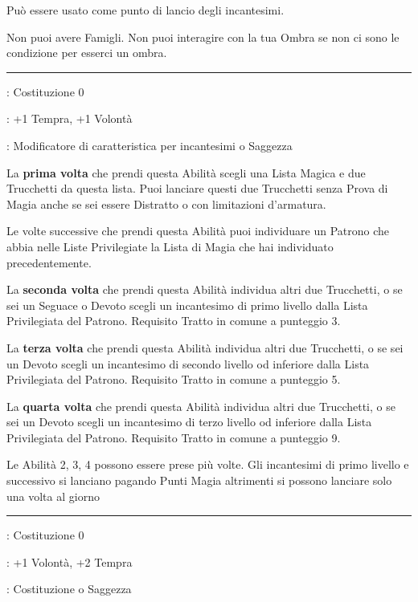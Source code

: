 \begin{multicols}{2}
Può essere usato come punto di lancio degli incantesimi.

Non puoi avere Famigli. Non puoi interagire con la tua Ombra se non ci sono le condizione per esserci un ombra.

\smallskip\noindent\rule{\linewidth}{2pt} \hypertarget{Figlio Unico}{}\medskip{}
\noindent
\begin{description}[noitemsep, topsep=0pt, parsep=0pt, partopsep=0pt, leftmargin=0cm, labelwidth=2.5cm]
    \item[\textbf{Requisito}]: Costituzione 0
    \item[\textbf{Tiri Salvezza}]: +1 Tempra, +1 Volontà
    \item[\textbf{Caratteristica}]: Modificatore di caratteristica per incantesimi o Saggezza
\end{description}

La \textbf{prima volta} che prendi questa Abilità scegli una Lista Magica e due Trucchetti da questa lista. Puoi lanciare questi due Trucchetti senza Prova di Magia anche se sei essere Distratto o con limitazioni d'armatura.

Le volte successive che prendi questa Abilità puoi individuare un Patrono che abbia nelle Liste Privilegiate la Lista di Magia che hai individuato precedentemente.

La \textbf{seconda volta} che prendi questa Abilità individua altri due Trucchetti, o se sei un Seguace o Devoto scegli un incantesimo di primo livello dalla Lista Privilegiata del Patrono. Requisito Tratto in comune a punteggio 3.

La \textbf{terza volta} che prendi questa Abilità individua altri due Trucchetti, o se sei un Devoto scegli un incantesimo di secondo livello od inferiore dalla Lista Privilegiata del Patrono. Requisito Tratto in comune a punteggio 5.

La \textbf{quarta volta} che prendi questa Abilità individua altri due Trucchetti, o se sei un Devoto scegli un incantesimo di terzo livello od inferiore dalla Lista Privilegiata del Patrono. Requisito Tratto in comune a punteggio 9.

Le Abilità 2, 3, 4 possono essere prese più volte. Gli incantesimi di primo livello e successivo si lanciano pagando Punti Magia altrimenti si possono lanciare solo una volta al giorno

\smallskip\noindent\rule{\linewidth}{2pt} \hypertarget{Finta Morte}{}\medskip{}
\noindent
\begin{description}[noitemsep, topsep=0pt, parsep=0pt, partopsep=0pt, leftmargin=0cm, labelwidth=2.5cm]
    \item[\textbf{Requisito}]: Costituzione 0
    \item[\textbf{Tiri Salvezza}]: +1 Volontà, +2 Tempra
    \item[\textbf{Caratteristica}]: Costituzione o Saggezza
\end{description}


\end{multicols}
